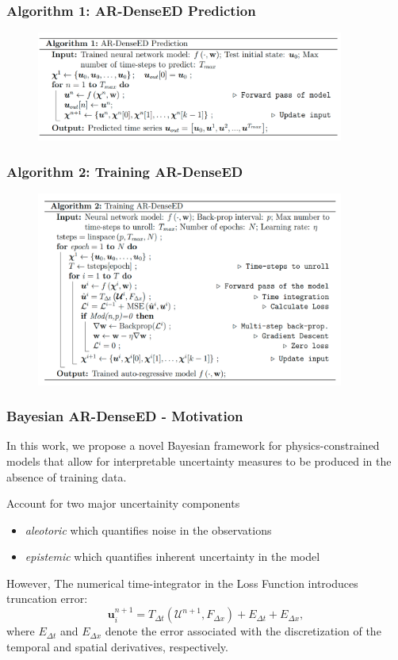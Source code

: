 \documentclass{beamer}
\theoremstyle{remark}
\begin{document}
\begin{frame}
\frametitle{Algorithm 1: AR-DenseED Prediction}
\begin{figure}
\includegraphics[width=0.9\textwidth]{alg1.png}
\end{figure}
\end{frame}

\begin{frame}
\frametitle{Algorithm 2: Training AR-DenseED}
\begin{figure}
\includegraphics[width=0.9\textwidth]{alg2.png}
\end{figure}

\end{frame}


\begin{frame}
\frametitle{Bayesian AR-DenseED - Motivation}
In this work, we propose a novel Bayesian framework for physics-constrained models that allow for interpretable uncertainty measures to be produced in the absence of training data.

Account for two major uncertainity components

\begin{itemize}
\item{\textit{aleotoric} which quantifies noise in the observations}
\item{\textit{epistemic} which quantifies inherent uncertainty in the model}
\end{itemize}

However, The numerical time-integrator in the Loss Function introduces truncation error:
\begin{equation}
    \bm{u}_{i}^{n+1} = T_{\Delta t}\left(\bm{\mathcal{U}}^{n+1}, F_{\Delta x}\right) + E_{\Delta t} + E_{\Delta x},
\end{equation}
where $E_{\Delta t}$ and $E_{\Delta x}$ denote the error associated with the discretization of the temporal and spatial derivatives, respectively.

\end{frame}
\end{document}
